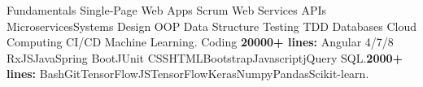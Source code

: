 \vspace{-3mm}
\begin{cvskills}
\vspace{1.5mm}\cvskill
    {Fundamentals}
    {Single-Page Web Apps \skilltypestyle{\textbf{|}} Scrum \skilltypestyle{\textbf{ |}} Web Services APIs \skilltypestyle{\textbf{ |}} Microservices\skilltypestyle{\textbf{ | }}Systems Design\skilltypestyle{\textbf{ |}} OOP \skilltypestyle{\textbf{|}} Data Structure \skilltypestyle{\textbf{ |}}\newline Testing\skilltypestyle{\textbf{ |}} TDD \skilltypestyle{\textbf{ |}} Databases\skilltypestyle{\textbf{ |}} Cloud Computing\skilltypestyle{\textbf{ |}} CI/CD\skilltypestyle{\textbf{ |}} Machine Learning.}
\vspace{1.5mm}\cvskill
     {Coding}
    {\textbf{20000+ lines:} Angular 4/7/8 \skilltypestyle{\textbf{ | }}RxJS\skilltypestyle{\textbf{ | }}Java\skilltypestyle{\textbf{ | }}Spring Boot\skilltypestyle{\textbf{ | }}JUnit \skilltypestyle{\textbf{ | }}CSS\skilltypestyle{\textbf{ | }}HTML\skilltypestyle{\textbf{ | }}Bootstrap\skilltypestyle{\textbf{ | }}Javascript\skilltypestyle{\textbf{ | }}jQuery \skilltypestyle{\textbf{ | }}SQL.\newline \textbf{2000+ lines:} Bash\skilltypestyle{\textbf{ | }}Git\skilltypestyle{\textbf{ | }}TensorFlowJS\skilltypestyle{\textbf{ | }}TensorFlow\skilltypestyle{\textbf{ | }}Keras\skilltypestyle{\textbf{ | }}Numpy\skilltypestyle{\textbf{ | }}Pandas\skilltypestyle{\textbf{ | }}Scikit-learn.  }          
\end{cvskills}
